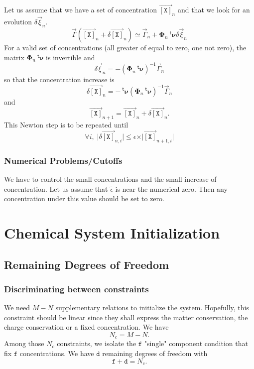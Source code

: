 \documentclass[aps,onecolumn]{revtex4}
\newcommand{\myconc}[1]{\left\lbrack #1 \right\rbrack}
\newcommand{\mychem}[1]{{\mathtt{#1}}}
\newcommand{\mymat}[1]{\boldsymbol{#1}}
\newcommand{\mytrn}[1]{{\!\!~^{\mathsf{t}}{#1}}}
\newcommand{\myvec}[1]{\overrightarrow{#1}}
\newcommand{\vecX}{\myvec{\myconc{\mychem{X}}}}
\newcommand{\dof}{\mathtt{d}}
\newcommand{\fixed}{\mathtt{f}}
\begin{document}
Let us assume that we have a set of concentration $\vecX_{n}$ and that we look for an evolution $\delta\vec{\xi}_{n}$.
\begin{equation}
	\vec{\Gamma}\left(\vecX_{n}+\delta\vecX_{n}\right) \simeq \vec{\Gamma}_{n} + \mymat{\Phi}_n \mytrn{\mymat{\nu}} \delta\vec{\xi}_n
\end{equation}
For a valid set of concentrations (all greater of equal to zero, one not zero), the matrix $\mymat{\Phi}_n \mytrn{\mymat{\nu}}$ is invertible
and
\begin{equation}
	\delta\vec{\xi}_n = -\left(\mymat{\Phi}_n \mytrn{\mymat{\nu}}\right)^{-1} \vec{\Gamma}_{n}
\end{equation}
so that the concentration increase is
\begin{equation}
	\delta\vecX_{n} = - \mytrn{\mymat{\nu}}\left(\mymat{\Phi}_n \mytrn{\mymat{\nu}}\right)^{-1} \vec{\Gamma}_{n}
\end{equation}
and
\begin{equation}
	\vecX_{n+1} = \vecX_{n} + \delta\vecX_{n}.
\end{equation}
This Newton step is to be repeated until
\begin{equation}
	\forall i, \; \vert\delta\vecX_{n,i}\vert \leq \epsilon \times \vert\vecX_{n+1,i}\vert
\end{equation}

\subsubsection{Numerical Problems/Cutoffs}
We have to control the small concentrations and the small increase of concentration.
Let us assume that $\tilde\epsilon$ is near the numerical zero. Then any concentration under this value
should be set to zero. 


\section{Chemical System Initialization}
\subsection{Remaining Degrees of Freedom}
\subsubsection{Discriminating between constraints}
We need $M-N$ supplementary relations to initialize the system. Hopefully, this constraint should be linear
since they shall express the matter conservation, the charge conservation or a fixed concentration.
We have
$$
	N_c  = M-N.
$$
Among those $N_c$ constraints, we isolate the $\fixed$ "single" component condition that fix $\fixed$ concentrations.
We have $\dof$ remaining degrees of freedom with
$$
	\fixed + \dof = N_c.
$$
\end{document}
